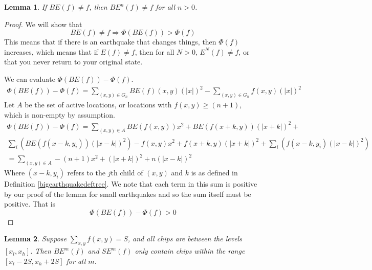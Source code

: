\documentclass[11pt]{article}
\newtheorem{lemma}{Lemma}
\begin{document}
\begin{lemma}
If $BE(f) \neq f$, then $BE^n(f) \neq f$ for all $n > 0$.
\end{lemma}

\begin{proof}
We will show that 
\begin{equation}
BE(f) \neq f \Rightarrow \Phi(BE(f)) > \Phi(f)
\end{equation}
This means that if there is an earthquake that changes things, then $\Phi(f)$ increases, which means that if $E(f) \neq f$, then for all $N > 0$, $E^N(f) \neq f$, or that you never return to your original state.

We can evaluate $\Phi(BE(f)) - \Phi(f)$.
\begin{align}
\Phi(BE(f))-\Phi(f) = \sum_{(x,y) \in G_n} BE(f)(x,y)(|x|)^2 - \sum_{(x,y) \in G_n} f(x,y)(|x|)^2 
\end{align}
Let $A$ be the set of active locations, or locations with $f(x,y) \geq (n+1)$, which is non-empty by assumption. 
\begin{align*}
\Phi(BE(f)) - \Phi(f) =  \sum_{(x,y) \in A}  BE(f(x,y))x^2 + BE(f(x+k,y))(|x+k|)^2 + \\
\sum_{i} \left( BE(f(x-k,y_i))(|x-k|)^2 \right) -f(x,y)x^2 +f(x+k,y) (|x+k|)^2 +  \sum_{i} \left ( f(x-k,y_i) (|x-k|)^2 \right)  \\
=\sum_{(x,y) \in A} -(n+1)x^2 + (|x+k|)^2 + n(|x-k|)^2 
\end{align*}
Where $(x-k,y_i)$ refers to the $j$th child of $(x,y)$ and $k$ is as defined in Definition \ref{bigearthquakedeftree}. We note that each term in this sum is positive by our proof of the lemma for small earthquakes and so the sum itself must be positive. That is 
\begin{equation}
\Phi(BE(f)) - \Phi(f) > 0
\end{equation}

\end{proof}

\begin{lemma}
\label{finiteextensiontree}
Suppose $\sum_{x,y} f(x,y) = S$, and all chips are between the levels $[x_l, x_h]$. Then $BE^m(f)$ and $SE^m(f)$ only contain chips within the range $[x_l - 2S, x_h + 2S]$ for all $m$.
\end{lemma}
\end{document}
